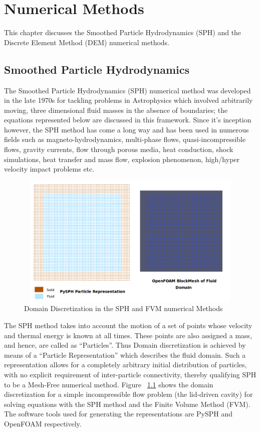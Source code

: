 \chapter{Numerical Methods}
%

This chapter discusses the Smoothed Particle Hydrodynamics (SPH) and the Discrete Element Method (DEM) numerical methods.

\section{Smoothed Particle Hydrodynamics}

The Smoothed Particle Hydrodynamics (SPH) numerical method was developed in the late 1970s \cite{gingold_monaghan} for tackling problems in Astrophysics which involved arbitrarily moving, three dimensional fluid masses in the absence of boundaries; the equations represented below are discussed in this framework. Since it's inception however, the SPH method has come a long way and has been used in numerous fields such as magneto-hydrodynamics, multi-phase flows, quasi-incompressible flows, gravity currents, flow through porous media, heat conduction, shock simulations, heat transfer and mass flow, explosion phenomenon, high/hyper velocity impact problems etc.

\begin{figure}[htb!]
\centering
\setlength\fboxsep{0pt}
      \includegraphics[width=5in, height=2.5in]{figures/particle_rep.png}
\caption{{\small{Domain Discretization in the SPH and FVM numerical Methods}}}
\label{fig:particle_representation}
\end{figure}

The SPH method takes into account the motion of a set of points whose velocity and thermal energy is known at all times. These points are also assigned a mass, and hence, are called as ``Particles''\cite{monaghan_intro}. Thus Domain discretization is achieved by means of a ``Particle Representation'' which describes the fluid domain. Such a representation allows for a completely arbitrary initial distribution of particles, with no explicit requirement of inter-particle connectivity, thereby qualifying SPH to be a Mesh-Free numerical method. Figure ~\ref{fig:particle_representation} shows the domain discretization for a simple incompressible flow problem (the lid-driven cavity) for solving equations with the SPH method and the Finite Volume Method (FVM). The software tools used for generating the representations are PySPH \cite{prabhu_puri} and OpenFOAM respectively.

